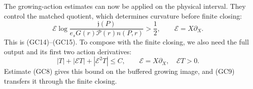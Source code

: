 \begingroup
\let\degreecarriersubsection\subsection
\let\degreecarriersubsubsection\subsubsection
\let\section\degreecarriersubsection
\let\subsection\degreecarriersubsubsection

\endgroup

The growing-action estimates can now be applied on the physical
interval. They control the matched quotient, which determines
curvature before finite closing:
\begin{equation}\label{deg:degree-growing-elasticity}
 \mathcal E\log\frac{\mathfrak j(P)}
    {e_sG(r)\mathcal P(r)n(P,r)}>\frac12,
 \qquad \mathcal E=X\partial_X.
\end{equation}
This is \textnormal{(GC14)--(GC15)}. To compose with the finite
closing, we also need the full output and its first two action derivatives:
\begin{equation}\label{deg:growing-actual-output-action}
 |T|+|\mathcal E T|+|\mathcal E^2T|\le C,
 \qquad \mathcal E=X\partial_X,\quad \mathcal E T>0.
\end{equation}
Estimate \textnormal{(GC8)} gives this bound on the buffered growing
image, and \textnormal{(GC9)} transfers it through the finite closing.

